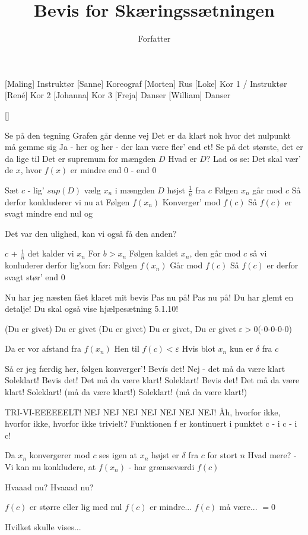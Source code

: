 \documentclass[a4paper,11pt]{article}
\title{Bevis for Skæringssætningen}
\author{Forfatter}
\begin{document}
\maketitle

\begin{roles}
[Maling] Instruktør
[Sanne] Koreograf
[Morten] Rus
[Loke] Kor 1 / Instruktør
[René] Kor 2
[Johanna] Kor 3
[Freja] Danser
[William] Danser
\end{roles}

\begin{props}
[]
\end{props}

\begin{song}
 Se på den tegning
Grafen går denne vej
Det er da klart nok
hvor det nulpunkt må gemme sig
Ja - her og her -
der kan være fler' end et!
Se på det største, det er da lige til
Det er supremum for mængden $D$
Hvad er $D$? Lad os se:
Det skal vær' de $x$, hvor $f(x)$ er mindre end 0 - end 0

 Sæt $c$ - lig' $sup(D)$
vælg $x_n$ i mængden $D$
højst $\frac{1}{n}$ fra $c$
Følgen $x_n$ går mod $c$
Så derfor konkluderer vi nu at
Følgen $f(x_n)$
Konverger' mod $f(c)$
Så $f(c)$ er svagt mindre end nul og

Det var den ulighed, kan vi også få den anden?

 $c$ + $\frac{1}{n}$
det kalder vi $x_n$
For $b > x_n$
Følgen kaldet $x_n$, den går mod $c$
så vi konluderer derfor lig'som før:
Følgen $f(x_n)$
Går mod $f(c)$
Så $f(c)$ er derfor svagt stør' end 0

 Nu har jeg næsten fået klaret mit bevis
 Pas nu på! Pas nu på! Du har glemt en detalje!
Du skal også vise hjælpesætning 5.1.10!

 (Du er givet) Du er givet (Du er givet) Du er givet, Du er givet $\varepsilon > 0$(-0-0-0-0)

 Da er vor afstand fra $f(x_n)$
 Hen til $f(c) < \varepsilon$
Hvis blot $x_n$ kun er $\delta$ fra $c$

 Så er jeg færdig her, følgen konverger'!
 Bevís det! Nej - det må da være klart
Soleklart!
Bevis det! Det må da være klart!
Soleklart!
Bevis det! Det må da være klart!
Soleklart! (må da være klart!)
Soleklart! (må da være klart!)

 TRI-VI-EEEEEELT!
 NEJ NEJ NEJ NEJ NEJ NEJ NEJ!
 Åh, hvorfor ikke, hvorfor ikke, hvorfor ikke trivielt?
 Funktionen f er kontinuert i punktet c - i c - i c!

 Da $x_n$ konvergerer mod $c$ ses igen
at $x_n$ højst er $\delta$ fra $c$ for stort $n$
Hvad mere? - Vi kan nu konkludere,
at $f(x_n)$ - har grænseværdi $f(c)$

 Hvaaad nu? Hvaaad nu?

 $f(c)$ er større
eller lig med nul
$f(c)$ er mindre...
$f(c)$ må være... $= 0$

 Hvilket skulle vises...
\end{song}
\end{document}
